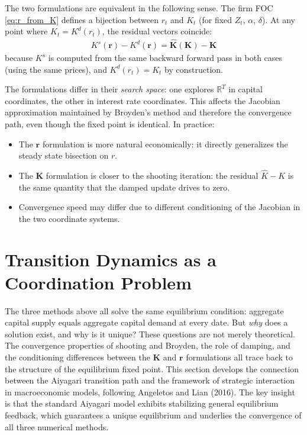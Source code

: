 \documentclass[12pt]{article}
\newcommand{\R}{\mathbb{R}}
\begin{document}
The two formulations are equivalent in the following sense. The firm FOC \eqref{eq:r_from_K} defines a bijection between $r_t$ and $K_t$ (for fixed $Z_t$, $\alpha$, $\delta$). At any point where $K_t = K^d(r_t)$, the residual vectors coincide:
\begin{align}
    K^s(\mathbf{r}) - K^d(\mathbf{r}) = \hat{\mathbf{K}}(\mathbf{K}) - \mathbf{K} \label{eq:equivalence}
\end{align}
because $K^s$ is computed from the same backward forward pass in both cases (using the same prices), and $K^d(r_t) = K_t$ by construction.

The formulations differ in their \emph{search space}: one explores $\R^T$ in capital coordinates, the other in interest rate coordinates. This affects the Jacobian approximation maintained by Broyden's method and therefore the convergence path, even though the fixed point is identical. In practice:
\begin{itemize}[nosep]
    \item The $\mathbf{r}$ formulation is more natural economically: it directly generalizes the steady state bisection on $r$.
    \item The $\mathbf{K}$ formulation is closer to the shooting iteration: the residual $\hat{K} - K$ is the same quantity that the damped update drives to zero.
    \item Convergence speed may differ due to different conditioning of the Jacobian in the two coordinate systems.
\end{itemize}

\section{Transition Dynamics as a Coordination Problem}
\label{sec:coordination}

The three methods above all solve the same equilibrium condition: aggregate capital supply equals aggregate capital demand at every date. But \emph{why} does a solution exist, and why is it unique? These questions are not merely theoretical. The convergence properties of shooting and Broyden, the role of damping, and the conditioning differences between the $\mathbf{K}$ and $\mathbf{r}$ formulations all trace back to the structure of the equilibrium fixed point. This section develops the connection between the Aiyagari transition path and the framework of strategic interaction in macroeconomic models, following Angeletos and Lian (2016). The key insight is that the standard Aiyagari model exhibits stabilizing general equilibrium feedback, which guarantees a unique equilibrium and underlies the convergence of all three numerical methods.
\end{document}
